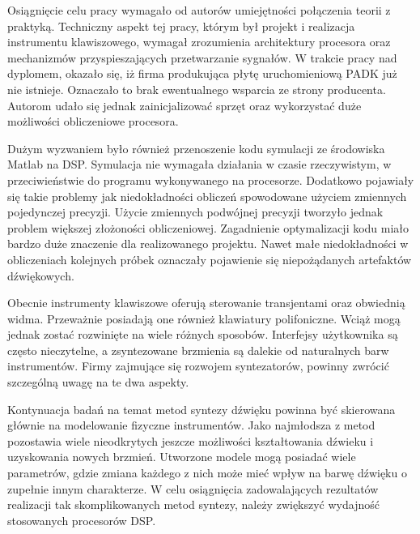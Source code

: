 Osiągnięcie celu pracy wymagało od autorów umiejętności połączenia teorii z praktyką. Techniczny aspekt tej pracy, którym był projekt i realizacja instrumentu klawiszowego, wymagał zrozumienia architektury procesora oraz mechanizmów przyspieszających przetwarzanie sygnałów. 
W trakcie pracy nad dyplomem, okazało się, iż firma produkująca płytę uruchomieniową PADK już nie istnieje. Oznaczało to brak ewentualnego wsparcia ze strony producenta. Autorom udało się jednak zainicjalizować sprzęt oraz wykorzystać duże możliwości obliczeniowe procesora.

Dużym wyzwaniem było również przenoszenie kodu symulacji ze środowiska Matlab na DSP. Symulacja nie wymagała działania w czasie rzeczywistym, w przeciwieństwie do programu wykonywanego na procesorze. Dodatkowo pojawiały się takie problemy jak niedokładności obliczeń spowodowane użyciem zmiennych pojedynczej precyzji. Użycie zmiennych podwójnej precyzji tworzyło jednak problem większej złożoności obliczeniowej. Zagadnienie optymalizacji kodu miało bardzo duże znaczenie dla realizowanego projektu. Nawet małe niedokładności w obliczeniach kolejnych próbek oznaczały pojawienie się niepożądanych artefaktów dźwiękowych.

Obecnie instrumenty klawiszowe oferują sterowanie transjentami oraz obwiednią widma. Przeważnie posiadają one również klawiatury polifoniczne. Wciąż mogą jednak zostać rozwinięte na wiele różnych sposobów. Interfejsy użytkownika są często nieczytelne, a zsyntezowane brzmienia są dalekie od naturalnych barw instrumentów. Firmy zajmujące się rozwojem syntezatorów, powinny zwrócić szczególną uwagę na te dwa aspekty.

Kontynuacja badań na temat metod syntezy dźwięku powinna być skierowana głównie na modelowanie fizyczne instrumentów. Jako najmłodsza z metod pozostawia wiele nieodkrytych jeszcze możliwości kształtowania dźwieku i uzyskowania nowych brzmień. Utworzone modele mogą posiadać wiele parametrów, gdzie zmiana każdego z nich może mieć wpływ na barwę dźwięku o zupełnie innym charakterze. W celu osiągnięcia zadowalających rezultatów realizacji tak skomplikowanych metod syntezy, należy zwiększyć wydajność stosowanych procesorów DSP.
